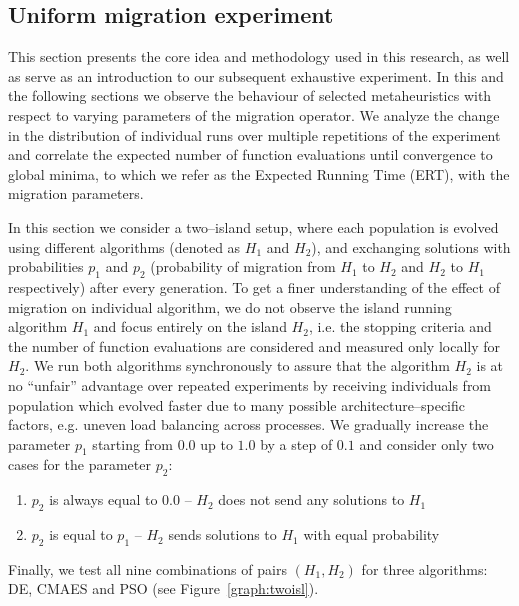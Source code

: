 \documentclass{sig-alternate}
\begin{document}
\subsection{Uniform migration experiment}
This section presents the core idea and methodology used in this research, as well as serve as an introduction to our subsequent exhaustive experiment.
In this and the following sections we observe the behaviour of selected metaheuristics with respect to varying parameters of the migration operator.
We analyze the change in the distribution of individual runs over multiple repetitions of the experiment and correlate the expected number of function evaluations until convergence to global minima, to which we refer as the Expected Running Time (ERT), with the migration parameters.

In this section we consider a two--island setup, where each population is evolved using different algorithms (denoted as $H_1$ and $H_2$), and exchanging solutions with probabilities $p_1$ and $p_2$ (probability of migration from $H_1$ to $H_2$ and $H_2$ to $H_1$ respectively) after every generation.
To get a finer understanding of the effect of migration on individual algorithm, we do not observe the island running algorithm $H_1$ and focus entirely on the island $H_2$, i.e. the stopping criteria and the number of function evaluations are considered and measured only locally for $H_2$.
We run both algorithms synchronously to assure that the algorithm $H_2$ is at no  ``unfair'' advantage over repeated experiments by receiving individuals from population which evolved faster due to many possible architecture--specific factors, e.g. uneven load balancing across processes.
We gradually increase the parameter $p_1$ starting from $0.0$ up to $1.0$ by a step of $0.1$ and consider only two cases for the parameter $p_2$: 
\begin{enumerate}
    \item $p_2$ is always equal to $0.0$ -- $H_2$ does not send any solutions to $H_1$
    \item $p_2$ is equal to $p_1$ -- $H_2$ sends solutions to $H_1$ with equal probability
\end{enumerate}
Finally, we test all nine combinations of pairs $(H_1, H_2)$ for three algorithms: DE, CMAES and PSO (see Figure~\ref{graph:twoisl}).
\end{document}
